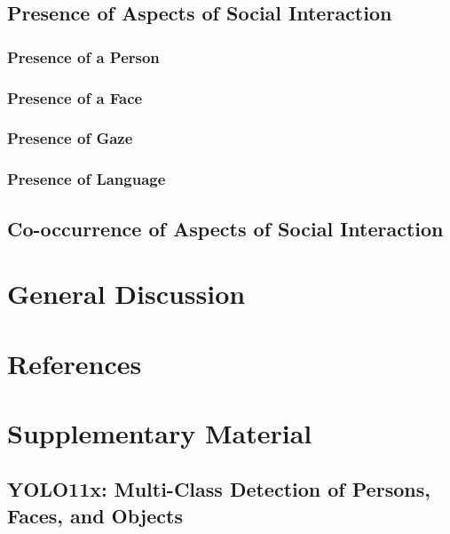 \documentclass[
  man,floatsintext]{apa6}
\begin{document}
\subsection{Presence of Aspects of Social Interaction}\label{presence-of-aspects-of-social-interaction}

\subsubsection{Presence of a Person}\label{presence-of-a-person}

\subsubsection{Presence of a Face}\label{presence-of-a-face}

\subsubsection{Presence of Gaze}\label{presence-of-gaze}

\subsubsection{Presence of Language}\label{presence-of-language}

\subsection{Co-occurrence of Aspects of Social Interaction}\label{co-occurrence-of-aspects-of-social-interaction}

\section{General Discussion}\label{general-discussion}

\newpage

\section{References}\label{references}

\newpage

\section{Supplementary Material}\label{supplementary-material}

\subsection{YOLO11x: Multi-Class Detection of Persons, Faces, and Objects}\label{yolo11x-multi-class-detection-of-persons-faces-and-objects}
\end{document}
